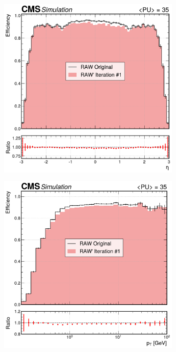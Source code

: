 \begin{figure}[h]
        \centering
        \begin{subfigure}[b]{0.49\textwidth}
            \centering
            \includegraphics[width=\textwidth]{Figures/Chapter5/efficiency_comparison_1_eta.pdf}
            \caption{}
        \end{subfigure}
        \begin{subfigure}[b]{0.49\textwidth}
            \centering
            \includegraphics[width=\textwidth]{Figures/Chapter5/efficiency_comparison_1_pt.pdf}

\end{subfigure}
\end{figure}
